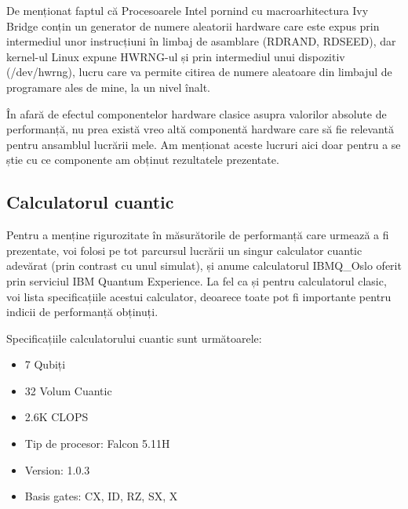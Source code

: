 De menționat faptul că Procesoarele Intel pornind cu macroarhitectura Ivy Bridge conțin un generator de numere aleatorii hardware care este expus prin intermediul unor instrucțiuni în limbaj de asamblare (RDRAND, RDSEED), dar kernel-ul Linux expune HWRNG-ul și prin intermediul unui dispozitiv (/dev/hwrng), lucru care va permite citirea de numere aleatoare din limbajul de programare ales de mine, la un nivel înalt. 


În afară de efectul componentelor hardware clasice asupra valorilor absolute de performanță, nu prea există vreo altă componentă hardware care să fie relevantă pentru ansamblul lucrării mele. Am menționat aceste lucruri aici doar pentru a se știe cu ce componente am obținut rezultatele prezentate.

\pagebreak

\subsection{Calculatorul cuantic}
Pentru a menține rigurozitate în măsurătorile de performanță care urmează a fi prezentate, voi folosi pe tot parcursul lucrării un singur calculator cuantic adevărat (prin contrast cu unul simulat), și anume calculatorul IBMQ\_Oslo oferit prin serviciul IBM Quantum Experience. La fel ca și pentru calculatorul clasic, voi lista specificațiile acestui calculator, deoarece toate pot fi importante pentru indicii de performanță obținuți.

Specificațiile calculatorului cuantic sunt următoarele:
\begin{itemize}
    \item 7 Qubiți
    \item 32 Volum Cuantic
    \item 2.6K CLOPS
    \item Tip de procesor: Falcon 5.11H
    \item Version: 1.0.3
    \item Basis gates: CX, ID, RZ, SX, X
\end{itemize}

